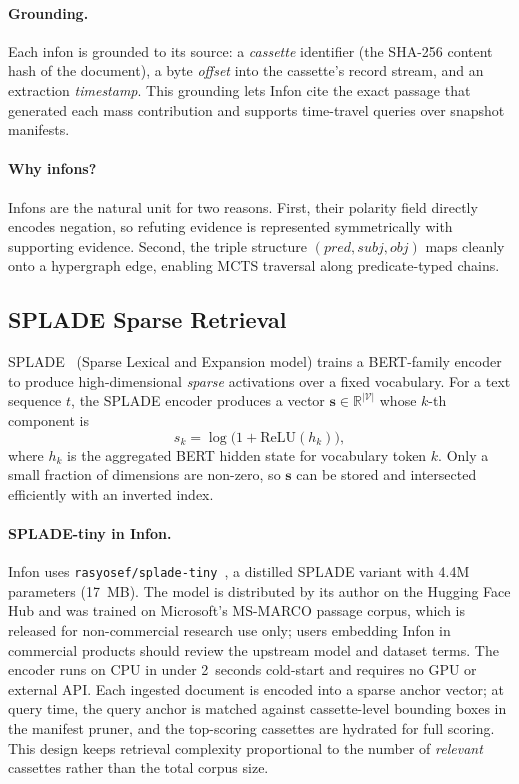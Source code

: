 \paragraph{Grounding.}
Each infon is grounded to its source: a \emph{cassette} identifier (the SHA-256
content hash of the document), a byte \emph{offset} into the cassette's record
stream, and an extraction \emph{timestamp}.  This grounding lets Infon cite
the exact passage that generated each mass contribution and supports
time-travel queries over snapshot manifests.

\paragraph{Why infons?}
Infons are the natural unit for two reasons.  First, their polarity field
directly encodes negation, so refuting evidence is represented symmetrically
with supporting evidence.  Second, the triple structure $(\mathit{pred},
\mathit{subj}, \mathit{obj})$ maps cleanly onto a hypergraph edge, enabling
MCTS traversal along predicate-typed chains.

\subsection{SPLADE Sparse Retrieval}
\label{sec:background:splade}

SPLADE~\cite{formal2021splade} (Sparse Lexical and Expansion model) trains a
BERT-family encoder to produce high-dimensional \emph{sparse} activations over
a fixed vocabulary.  For a text sequence $t$, the SPLADE encoder produces a
vector $\mathbf{s} \in \mathbb{R}^{|\mathcal{V}|}$ whose $k$-th component is
\[
  s_k = \log\!\bigl(1 + \mathrm{ReLU}(h_k)\bigr),
\]
where $h_k$ is the aggregated BERT hidden state for vocabulary token $k$.
Only a small fraction of dimensions are non-zero, so $\mathbf{s}$ can be
stored and intersected efficiently with an inverted index.

\paragraph{SPLADE-tiny in Infon.}
Infon uses \texttt{rasyosef/splade-tiny}~\cite{alemneh2025spladetiny}, a
distilled SPLADE variant with 4.4M parameters (17~MB).  The model is
distributed by its author on the Hugging Face Hub and was trained on
Microsoft's MS-MARCO passage corpus, which is released for
non-commercial research use only; users embedding Infon in commercial
products should review the upstream model and dataset terms.  The encoder
runs on CPU in under 2~seconds cold-start and requires no GPU or external
API.  Each ingested document is encoded into a
sparse anchor vector; at query time, the query anchor is matched against
cassette-level bounding boxes in the manifest pruner, and the top-scoring
cassettes are hydrated for full scoring.  This design keeps retrieval
complexity proportional to the number of \emph{relevant} cassettes rather than
the total corpus size.

